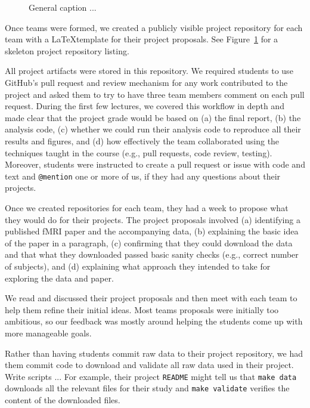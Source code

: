 \begin{figure}
\centering

\caption{General caption ...}
\label{fig:repo}
\end{figure}

Once teams were formed, we created a publicly visible project repository for
each team with a \LaTeX template for their project proposals.
See Figure~\ref{fig:repo} for a skeleton project repository listing.

All project artifacts were stored in this repository.
We required students to use GitHub's pull request and review mechanism
for any work contributed to the project and asked them to try to have
three team members comment on each pull request.
During the first few lectures, we covered this workflow in depth
and made clear that the project grade would be based on
(a) the final report,
(b) the analysis code,
(c) whether we could run their analysis code to reproduce all
their results and figures, and
(d) how effectively the team collaborated using the techniques
taught in the course (e.g., pull requests, code review, testing).
Moreover, students were instructed to create a pull request
or issue with code and text and \texttt{@mention} one or more of us,
if they had any questions about their projects.

Once we created repositories for each team, they had a week to propose what
they would do for their projects.
The project proposals involved
(a) identifying a published fMRI paper and the accompanying data,
(b) explaining the basic idea of the paper in a paragraph,
(c) confirming that they could download the data and that what they
downloaded passed basic sanity checks (e.g., correct number of subjects), and
(d) explaining what approach they intended to take for exploring
the data and paper.

We read and discussed their project proposals and then meet with each
team to help them refine their initial ideas.
Most teams proposals were initially too ambitious, so our feedback
was mostly around helping the students come up with more manageable
goals.
 
Rather than having students commit raw data to their project repository, we had
them commit code to download and validate all raw data used in their project.
Write scripts ...
For example, their project \texttt{README} might tell us that \texttt{make data}
downloads all the relevant files for their study and \texttt{make validate}
verifies the content of the downloaded files.

